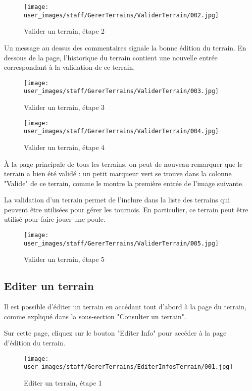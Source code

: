 \begin{figure}[H]
\centering
\texttt{[image: user\_images/staff/GererTerrains/ValiderTerrain/002.jpg]}
\caption{Valider un terrain, étape 2}
\end{figure}

Un message au dessus des commentaires signale la bonne édition du terrain. En dessous de la page, l'historique du terrain contient une nouvelle entrée correspondant à la validation de ce terrain.

\begin{figure}[H]
\centering
\texttt{[image: user\_images/staff/GererTerrains/ValiderTerrain/003.jpg]}
\caption{Valider un terrain, étape 3}
\end{figure}

\begin{figure}[H]
\centering
\texttt{[image: user\_images/staff/GererTerrains/ValiderTerrain/004.jpg]}
\caption{Valider un terrain, étape 4}
\end{figure}

À la page principale de tous les terrains, on peut de nouveau remarquer que le terrain a bien été validé : un petit marqueur vert se trouve dans la colonne "Valide" de ce terrain, comme le montre la première entrée de l'image suivante.\newline

La validation d'un terrain permet de l'inclure dans la liste des terrains qui peuvent être utilisées pour gérer les tournois. En particulier, ce terrain peut être utilisé pour faire jouer une poule.

\begin{figure}[H]
\centering
\texttt{[image: user\_images/staff/GererTerrains/ValiderTerrain/005.jpg]}
\caption{Valider un terrain, étape 5}
\end{figure}

\subsection{Editer un terrain}

Il est possible d'éditer un terrain en accédant tout d'abord à la page du terrain, comme expliqué dans la sous-section "Consulter un terrain".\newline

Sur cette page, cliquez sur le bouton "Editer Info" pour accéder à la page d'édition du terrain.

\begin{figure}[H]
\centering
\texttt{[image: user\_images/staff/GererTerrains/EditerInfosTerrain/001.jpg]}
\caption{Editer un terrain, étape 1}
\end{figure}

